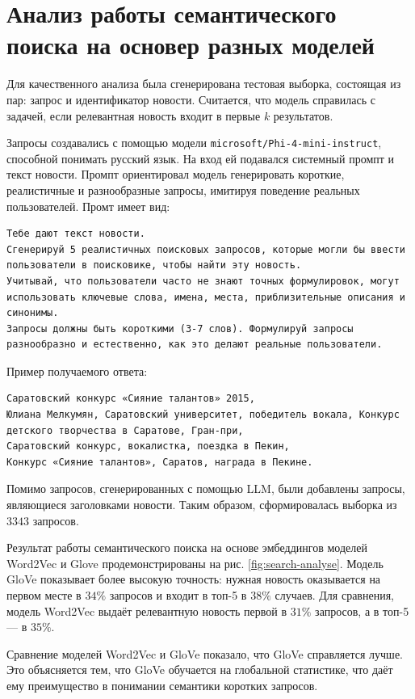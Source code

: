 \documentclass[coursework]{SCWorks}
\begin{document}
\section{Анализ работы семантического поиска на основер разных моделей}
Для качественного анализа была сгенерирована тестовая выборка, состоящая из пар: запрос и идентификатор новости. Считается, что модель справилась с задачей, если релевантная новость входит в первые $k$ результатов.

Запросы создавались с помощью модели \verb|microsoft/Phi-4-mini-instruct|, способной понимать русский язык. На вход ей подавался системный промпт и текст новости. Промпт ориентировал модель генерировать короткие, реалистичные и разнообразные запросы, имитируя поведение реальных пользователей. Промт имеет вид:
\begin{verbatim}
Тебе дают текст новости. 
Сгенерируй 5 реалистичных поисковых запросов, которые могли бы ввести пользователи в поисковике, чтобы найти эту новость. 
Учитывай, что пользователи часто не знают точных формулировок, могут использовать ключевые слова, имена, места, приблизительные описания и синонимы. 
Запросы должны быть короткими (3-7 слов). Формулируй запросы разнообразно и естественно, как это делают реальные пользователи.
\end{verbatim}

Пример получаемого ответа:
\begin{verbatim}
Саратовский конкурс «Сияние талантов» 2015, 
Юлиана Мелкумян, Саратовский университет, победитель вокала, Конкурс детского творчества в Саратове, Гран-при, 
Саратовский конкурс, вокалистка, поездка в Пекин, 
Конкурс «Сияние талантов», Саратов, награда в Пекине.
\end{verbatim}

Помимо запросов, сгенерированных с помощью LLM, были добавлены запросы, являющиеся заголовками новости.
Таким образом, сформировалась выборка из $3343$ запросов.

Результат работы семантического поиска на основе эмбеддингов моделей Word2Vec и Glove продемонстрированы на рис. \ref{fig:search-analyse}. Модель GloVe показывает более высокую точность: нужная новость оказывается на первом месте в $34\%$ запросов и входит в топ-5 в $38\%$ случаев. Для сравнения, модель Word2Vec выдаёт релевантную новость первой в $31\%$ запросов, а в топ-5 — в $35\%$.

Сравнение моделей Word2Vec и GloVe показало, что GloVe справляется лучше. Это объясняется тем, что GloVe обучается на глобальной статистике, что даёт ему преимущество в понимании семантики коротких запросов.
\end{document}

